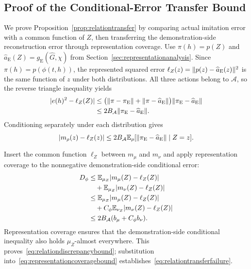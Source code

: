 \subsection{Proof of the Conditional-Error Transfer Bound}
\label{app:relationtransfer}
We prove Proposition~\ref{prop:relationtransfer} by comparing actual imitation error with a common function of $Z$, then transferring the demonstration-side reconstruction error through representation coverage.
Use $\pi(h)=p(Z)$ and $\widehat a_{\mathrm E}(Z)=g_{\mathrm E}(\widehat G,\chi)$ from Section~\ref{sec:representationanalysis}.
Since $\pi(h)=p(\phi(t,h))$, the represented squared error
$\ell_Z(z)=\lVert p(z)-\widehat a_{\mathrm E}(z)\rVert^2$ is the same function of $z$ under both distributions.
All three actions belong to $\mathcal A$, so the reverse triangle inequality yields
\begin{equation}
 \begin{aligned}
 |e(h)^2-\ell_Z(Z)|
 &\le\bigl(\lVert\pi-\pi_{\mathrm E}\rVert
       +\lVert\pi-\widehat a_{\mathrm E}\rVert\bigr)
       \lVert\pi_{\mathrm E}-\widehat a_{\mathrm E}\rVert\\
 &\le 2B_{\mathcal A}\lVert\pi_{\mathrm E}-\widehat a_{\mathrm E}\rVert.
 \end{aligned}
 \label{eq:appsquarederrorperturbation}
\end{equation}
Conditioning separately under each distribution gives
\begin{equation}
 |m_\rho(z)-\ell_Z(z)|
 \le 2B_{\mathcal A}
 \mathbb E_\rho[\lVert\pi_{\mathrm E}-\widehat a_{\mathrm E}\rVert\mid Z=z].
 \label{eq:appconditionalexpertapprox}
\end{equation}

Insert the common function $\ell_Z$ between $m_\mu$ and $m_\nu$ and apply representation coverage to the nonnegative demonstration-side conditional error:
\begin{equation}
 \begin{aligned}
 D_\phi
 &\le\mathbb E_{\mu_Z}|m_\mu(Z)-\ell_Z(Z)|\\
 &\quad+\mathbb E_{\mu_Z}|m_\nu(Z)-\ell_Z(Z)|\\
 &\le\mathbb E_{\mu_Z}|m_\mu(Z)-\ell_Z(Z)|\\
 &\quad+C_\phi\mathbb E_{\nu_Z}|m_\nu(Z)-\ell_Z(Z)|\\
 &\le 2B_{\mathcal A}(b_\mu+C_\phi b_\nu).
 \end{aligned}
 \label{eq:apprelationdiscrepancy}
\end{equation}
Representation coverage ensures that the demonstration-side conditional inequality also holds $\mu_Z$-almost everywhere.
This proves~\eqref{eq:relationdiscrepancybound}; substitution into~\eqref{eq:representationcoveragebound} establishes~\eqref{eq:relationtransferfailure}.
